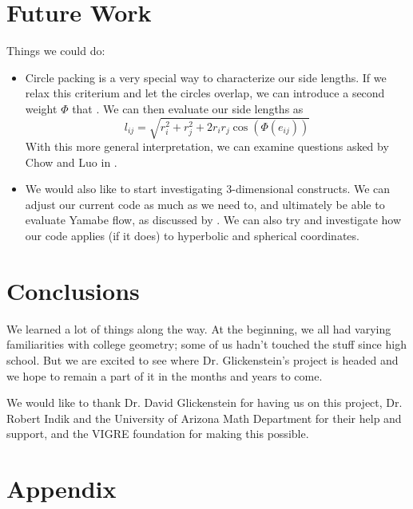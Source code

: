 \documentclass[12pt]{article}
\begin{document}
\newpage
\section{Future Work}
\maketitle
  Things we could do:
  \begin{itemize}

  \item Circle packing is a very special way to characterize our side lengths. If we relax this criterium and let the circles overlap, we can introduce a second weight $\Phi$ that . We can then evaluate our side lengths as $$l_{ij} = \sqrt{r_i^2 + r_j^2 + 2r_ir_j\cos(\Phi(e_{ij}))}$$ With this more general interpretation, we can examine questions asked by Chow and Luo in \cite{chowluo}.  
  
  \item We would also like to start investigating 3-dimensional constructs. We can adjust our current code as much as we need to, and ultimately be able to evaluate Yamabe flow, as discussed by \cite{DrG}. We can also try and investigate how our code applies (if it does) to hyperbolic and spherical coordinates. 
  \end{itemize} 
  
  \newpage
  \section{Conclusions}
  We learned a lot of things along the way. At the beginning, we all had varying familiarities with college geometry; some of us hadn't touched the stuff since high school. But we are excited to see where Dr. Glickenstein's project is headed and we hope to remain a part of it in the months and years to come.\newline
  
  \noindent We would like to thank Dr. David Glickenstein for having us on this project, Dr. Robert Indik and the University of Arizona Math Department for their help and support, and the VIGRE foundation for making this possible. 
  \maketitle
   
  \newpage
    
  
  
  \newpage
  \section*{Appendix}
  \maketitle
  
\end{document}
